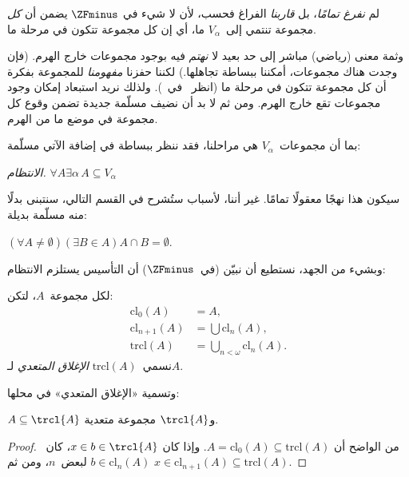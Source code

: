 \documentclass[../../../include/open-logic-section]{subfiles}
\begin{document}


لم \emph{نفرغ تمامًا}، بل \emph{قاربنا} الفراغ فحسب، لأن لا شيء في
$\ZFminus$ يضمن أن \emph{كل} مجموعة تنتمي إلى~$V_\alpha$ ما، أي إن
كل مجموعة تتكون في مرحلة ما.

وثمة معنى (رياضي) مباشر إلى حد بعيد لا \emph{نهتم} فيه بوجود مجموعات
خارج الهرم. (فإن وجدت هناك مجموعات، أمكننا ببساطة تجاهلها.) لكننا
حفزنا \emph{مفهومنا} للمجموعة بفكرة أن كل مجموعة تتكون في مرحلة ما
(انظر~\stageshier{} في~). ولذلك نريد استبعاد
إمكان وجود مجموعات تقع خارج الهرم. ومن ثم لا بد أن نضيف مسلّمة جديدة
تضمن وقوع كل مجموعة في موضع ما من الهرم.

بما أن مجموعات~$V_\alpha$ هي مراحلنا، فقد ننظر ببساطة في إضافة الآتي
مسلّمة:

\begin{defish}
\emph{الانتظام.} $\forall A \exists \alpha\, A \subseteq V_\alpha$
\end{defish}

سيكون هذا نهجًا معقولًا تمامًا. غير أننا، لأسباب ستُشرح في القسم
التالي، سنتبنى بدلًا منه مسلّمة بديلة:

\begin{axiom}[التأسيس]
$(\forall A \neq \emptyset)(\exists B \in A)A \cap B = \emptyset$.
\end{axiom}

وبشيء من الجهد، نستطيع أن نبيّن (في~$\ZFminus$) أن التأسيس يستلزم
الانتظام:
\begin{defn}
لكل مجموعة~$A$، لتكن:
\begin{align*}
	\text{cl}_0(A) &= A,\\
	\text{cl}_{n+1}(A) &= \bigcup \text{cl}_n(A),\\
	\text{trcl}(A) &= \bigcup_{n < \omega} \text{cl}_{n}(A).
\end{align*}
نسمي~$\text{trcl}(A)$ \emph{الإغلاق المتعدي} لـ$A$.
\end{defn}
\noindent
وتسمية «الإغلاق المتعدي» في محلها:
\begin{prop}
$A \subseteq \trcl{A}$ و$\trcl{A}$ مجموعة متعدية.
\end{prop}

\begin{proof}
من الواضح أن
$A = \text{cl}_0(A) \subseteq \text{trcl}(A)$. وإذا كان
$x \in b \in \trcl{A}$، كان~$b \in \text{cl}_n(A)$ لبعض~$n$، ومن ثم
$x \in \text{cl}_{n+1}(A) \subseteq \text{trcl}(A)$.
\end{proof}
\end{document}
